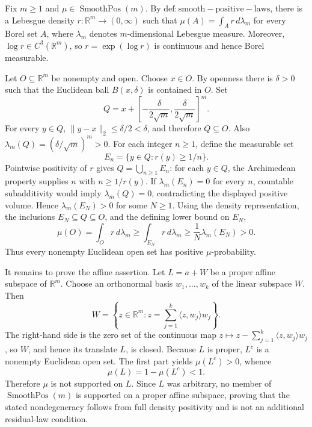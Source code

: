 Fix \(m\ge 1\) and \(\mu\in\operatorname{SmoothPos}(m)\). By \(\mathrm{def:smooth-positive-laws}\), there is a Lebesgue density \(r:\mathbb R^m\to(0,\infty)\) such that \(\mu(A)=\int_A r\,d\lambda_m\) for every Borel set \(A\), where \(\lambda_m\) denotes \(m\)-dimensional Lebesgue measure. Moreover, \(\log r\in C^3(\mathbb R^m)\), so \(r=\exp(\log r)\) is continuous and hence Borel measurable.

Let \(O\subseteq\mathbb R^m\) be nonempty and open. Choose \(x\in O\). By openness there is \(\delta>0\) such that the Euclidean ball \(B(x,\delta)\) is contained in \(O\). Set
\[
Q=x+\left[-\frac{\delta}{2\sqrt m},\frac{\delta}{2\sqrt m}\right]^m.
\]
For every \(y\in Q\), \(\lVert y-x\rVert_2\le \delta/2<\delta\), and therefore \(Q\subseteq O\). Also \(\lambda_m(Q)=(\delta/\sqrt m)^m>0\). For each integer \(n\ge1\), define the measurable set
\[
E_n=\{y\in Q:r(y)\ge 1/n\}.
\]
Pointwise positivity of \(r\) gives \(Q=\bigcup_{n\ge1}E_n\): for each \(y\in Q\), the Archimedean property supplies \(n\) with \(n\ge 1/r(y)\). If \(\lambda_m(E_n)=0\) for every \(n\), countable subadditivity would imply \(\lambda_m(Q)=0\), contradicting the displayed positive volume. Hence \(\lambda_m(E_N)>0\) for some \(N\ge1\). Using the density representation, the inclusions \(E_N\subseteq Q\subseteq O\), and the defining lower bound on \(E_N\),
\[
\mu(O)=\int_O r\,d\lambda_m
\ge \int_{E_N}r\,d\lambda_m
\ge \frac{1}{N}\lambda_m(E_N)>0.
\]
Thus every nonempty Euclidean open set has positive \(\mu\)-probability.

It remains to prove the affine assertion. Let \(L=a+W\) be a proper affine subspace of \(\mathbb R^m\). Choose an orthonormal basis \(w_1,\ldots,w_k\) of the linear subspace \(W\). Then
\[
W=\left\{z\in\mathbb R^m:
z=\sum_{j=1}^k\langle z,w_j\rangle w_j\right\}.
\]
The right-hand side is the zero set of the continuous map \(z\mapsto z-\sum_{j=1}^k\langle z,w_j\rangle w_j\), so \(W\), and hence its translate \(L\), is closed. Because \(L\) is proper, \(L^c\) is a nonempty Euclidean open set. The first part yields \(\mu(L^c)>0\), whence
\[
\mu(L)=1-\mu(L^c)<1.
\]
Therefore \(\mu\) is not supported on \(L\). Since \(L\) was arbitrary, no member of \(\operatorname{SmoothPos}(m)\) is supported on a proper affine subspace, proving that the stated nondegeneracy follows from full density positivity and is not an additional residual-law condition.